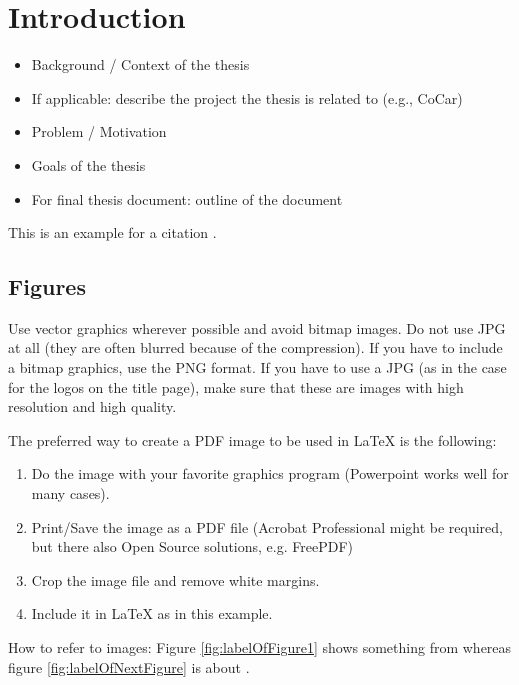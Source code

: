 \chapter{Introduction}
\label{cha:intro}


\begin{itemize}
\item Background / Context of the thesis
\item If applicable: describe the project the thesis is related to (e.g., CoCar)
\item Problem / Motivation
\item Goals of the thesis
\item For final thesis document: outline of the document
\end{itemize}

This is an example for a citation \cite{DBLP:journals/jods/KenscheQCJ07}.

\section{Figures}

Use vector graphics wherever possible and avoid bitmap images. Do not
use JPG at all (they are often blurred because of the compression). If
you have to include a bitmap graphics, use the PNG format. If you have
to use a JPG (as in the case for the logos on the title page), make sure
that these are images with high resolution and high quality.

The preferred way to create a PDF image to be used in LaTeX is the following:
\begin{enumerate}
\item Do the image with your favorite graphics program (Powerpoint works well for many cases).
\item Print/Save the image as a PDF file (Acrobat Professional might be required, but
there also Open Source solutions, e.g. FreePDF)
\item Crop the image file and remove white margins.
\item Include it in LaTeX as in this example.
\end{enumerate}

How to refer to images:
Figure \ref{fig:labelOfFigure1} shows something from \cite{AfratiPODS2002}
whereas figure \ref{fig:labelOfNextFigure} is about \cite{LenzeriniPODS2002}.

